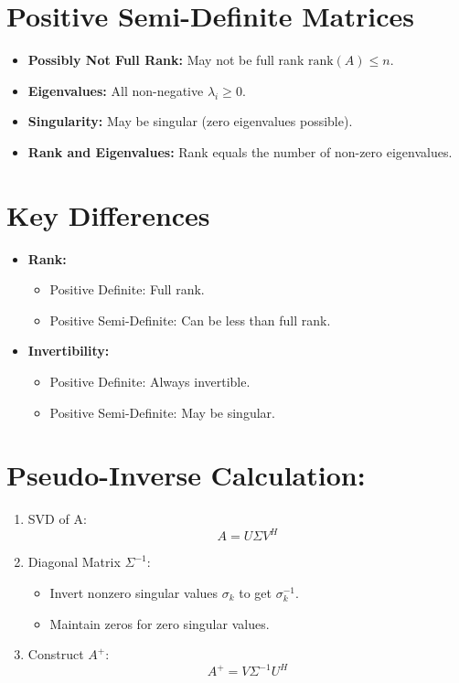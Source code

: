 \documentclass{article}
\begin{document}
\section*{Positive Semi-Definite Matrices}
\begin{itemize}[leftmargin=*]
    \item \textbf{Possibly Not Full Rank:} May not be full rank \(\text{rank}(A) \leq n\).
    \item \textbf{Eigenvalues:} All non-negative \(\lambda_i \geq 0\).
    \item \textbf{Singularity:} May be singular (zero eigenvalues possible).
    \item \textbf{Rank and Eigenvalues:} Rank equals the number of non-zero eigenvalues.
\end{itemize}

\section*{Key Differences}
\begin{itemize}[leftmargin=*]
    \item \textbf{Rank:}
    \begin{itemize}[leftmargin=*]
        \item Positive Definite: Full rank.
        \item Positive Semi-Definite: Can be less than full rank.
    \end{itemize}
    
    \item \textbf{Invertibility:}
    \begin{itemize}[leftmargin=*]
        \item Positive Definite: Always invertible.
        \item Positive Semi-Definite: May be singular.
    \end{itemize}
\end{itemize}





\section*{Pseudo-Inverse Calculation:}

\begin{enumerate}
    \item SVD of A:
    \[
    A = U \Sigma V^H
    \]
    
    \item Diagonal Matrix $\Sigma^{-1}$:
    \begin{itemize}
        \item Invert nonzero singular values $\sigma_k$ to get $\sigma_k^{-1}$.
        \item Maintain zeros for zero singular values.
    \end{itemize}
    
    \item Construct $A^+$:
    \[
    A^+ = V \Sigma^{-1} U^H
    \]

\end{enumerate}
\end{document}
